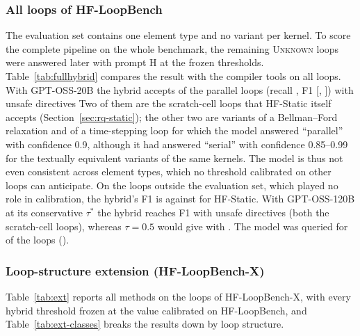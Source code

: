 \subsubsection{All loops of HF-LoopBench}
\label{sec:rq-full}
The evaluation set contains one element type and no  variant per kernel. To score the complete pipeline on the whole benchmark, the remaining \textsc{Unknown} loops were answered later with prompt H at the frozen thresholds. Table~\ref{tab:fullhybrid} compares the result with the compiler tools on all \nBenchLoops{} loops. With GPT-OSS-20B the hybrid accepts \fhTwentyTP{} of the \nBenchPar{} parallel loops (recall \fhTwentyRec{}, F1 \fhTwentyFone{} [\fhTwentyFoneLo{}, \fhTwentyFoneHi{}]) with \fhTwentyFP{} unsafe directives\fhTwentyFPNote{} Two of them are the  scratch-cell loops that HF-Static itself accepts (Section~\ref{sec:rq-static}); the other two are  variants of a Bellman--Ford relaxation and of a time-stepping loop for which the model answered ``parallel'' with confidence 0.9, although it had answered ``serial'' with confidence 0.85--0.99 for the textually equivalent  variants of the same kernels. The model is thus not even consistent across element types, which no threshold calibrated on other loops can anticipate. On the \fhOutN{} loops outside the evaluation set, which played no role in calibration, the hybrid's F1 is \fhTwentyOutFone{} against \fhStaticOutFone{} for HF-Static. With GPT-OSS-120B at its conservative $\tau^*$ the hybrid reaches F1 \fhOneTwentyFone{} with \fhOneTwentyFP{} unsafe directives (both the scratch-cell loops), whereas $\tau=0.5$ would give \fhOneTwentyFiftyFone{} with \fhOneTwentyFiftyFP{}. The model was queried for \fhTwentyQueried{} of the \nBenchLoops{} loops (\fhQueriedPct{}).



\subsubsection{Loop-structure extension (HF-LoopBench-X)}
\label{sec:rq-ext}
Table~\ref{tab:ext} reports all methods on the \xLoops{} loops of HF-LoopBench-X, with every hybrid threshold frozen at the value calibrated on HF-LoopBench, and Table~\ref{tab:ext-classes} breaks the results down by loop structure. \extText{}

